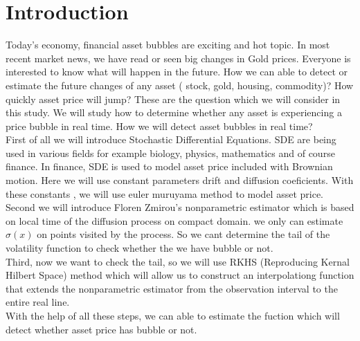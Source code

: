 \section{Introduction}
Today's economy, financial asset bubbles are exciting and hot topic. In most recent market news, we have read or seen big changes in Gold prices. Everyone is interested to know what will happen in the future. How we can able to detect or estimate the future changes of any asset ( stock, gold, housing, commodity)? How quickly asset price will jump? These are the question which we will consider in this study. We will study how to determine whether any asset is experiencing a price bubble in real time. How we will detect asset bubbles in real time?\\

 First of all we will introduce Stochastic Differential Equations. SDE are being used in various fields for example biology, physics, mathematics and of course finance. In finance, SDE is used to model asset price included with Brownian motion. Here we will use constant parameters drift and diffusion coeficients. With these constants , we will use euler muruyama method to model asset price. \\
 
 Second we will introduce Floren Zmirou's nonparametric estimator which is based on local time of the diffusion process on compact domain. we only can estimate $\sigma(x)$ on points visited by the process. So we cant determine the tail of the volatility function to check whether the we have bubble or not. \\
 
 Third, now we want to check the tail, so we will use RKHS (Reproducing Kernal Hilbert Space)  method which will allow us to construct an interpolationg function that extends the nonparametric estimator from the observation interval to the entire real line.\\
 
 With the help of all these steps, we can able to estimate the fuction which will detect whether asset price has bubble or not.\\
 
 


